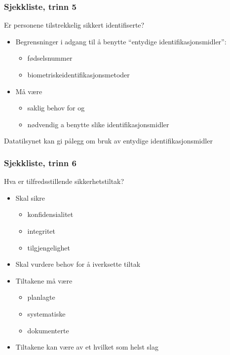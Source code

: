\documentclass[11pt]{article}
\begin{document}
\subsubsection{Sjekkliste, trinn 5}
\label{sec-17.1.5}

    Er personene tilstrekkelig sikkert identifiserte?
\begin{itemize}
\item Begrensninger i adgang til å benytte “entydige identifikasjonsmidler”:

\begin{itemize}
\item fødselsnummer
\item biometriskeidentifikasjonsmetoder
\end{itemize}

\item Må være

\begin{itemize}
\item saklig behov for og
\item nødvendig a benytte slike identifikasjonsmidler
\end{itemize}

\end{itemize}
    Datatilsynet kan gi pålegg om bruk av entydige identifikasjonsmidler
\subsubsection{Sjekkliste, trinn 6}
\label{sec-17.1.6}

    Hva er tilfredsstillende sikkerhetstiltak?
\begin{itemize}
\item Skal sikre

\begin{itemize}
\item konfidensialitet
\item integritet
\item tilgjengelighet
\end{itemize}

\item Skal vurdere behov for å iverksette tiltak
\item Tiltakene må være

\begin{itemize}
\item planlagte
\item systematiske
\item dokumenterte
\end{itemize}

\item Tiltakene kan være av et hvilket som helst slag
\end{itemize}
\end{document}
